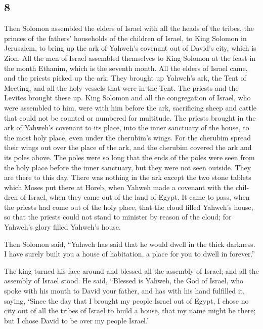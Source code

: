 \begin{paracol}{2}
\switchcolumn
\begin{otherlanguage}{english}

\hypertarget{section-15}{%
\section{8}\label{section-15}}

 Then Solomon assembled the elders of Israel with all the
heads of the tribes, the princes of the fathers' households of the
children of Israel, to King Solomon in Jerusalem, to bring up the ark of
Yahweh's covenant out of David's city, which is Zion.  All
the men of Israel assembled themselves to King Solomon at the feast in
the month Ethanim, which is the seventh month.  All the
elders of Israel came, and the priests picked up the ark. 
They brought up Yahweh's ark, the Tent of Meeting, and all the holy
vessels that were in the Tent. The priests and the Levites brought these
up.  King Solomon and all the congregation of Israel, who
were assembled to him, were with him before the ark, sacrificing sheep
and cattle that could not be counted or numbered for multitude.
 The priests brought in the ark of Yahweh's covenant to
its place, into the inner sanctuary of the house, to the most holy
place, even under the cherubim's wings.  For the cherubim
spread their wings out over the place of the ark, and the cherubim
covered the ark and its poles above.  The poles were so
long that the ends of the poles were seen from the holy place before the
inner sanctuary, but they were not seen outside. They are there to this
day.  There was nothing in the ark except the two stone
tablets which Moses put there at Horeb, when Yahweh made a covenant with
the children of Israel, when they came out of the land of Egypt.
 It came to pass, when the priests had come out of the
holy place, that the cloud filled Yahweh's house,  so
that the priests could not stand to minister by reason of the cloud; for
Yahweh's glory filled Yahweh's house.

 Then Solomon said, ``Yahweh has said that he would dwell
in the thick darkness.  I have surely built you a house
of habitation, a place for you to dwell in forever.''

 The king turned his face around and blessed all the
assembly of Israel; and all the assembly of Israel stood.
 He said, ``Blessed is Yahweh, the God of Israel, who
spoke with his mouth to David your father, and has with his hand
fulfilled it, saying,  `Since the day that I brought my
people Israel out of Egypt, I chose no city out of all the tribes of
Israel to build a house, that my name might be there; but I chose David
to be over my people Israel.'


\end{otherlanguage}
\end{paracol}

